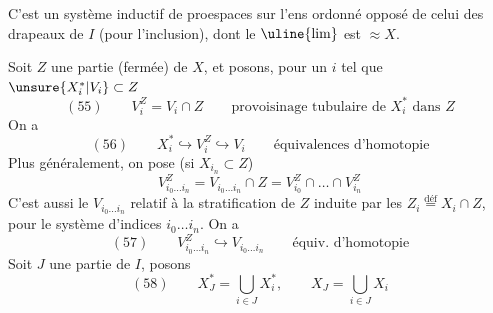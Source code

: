 C'est un système inductif de  proespaces
sur l'ens ordonné opposé de celui des drapeaux de $I$
(pour l'inclusion), dont le $\uline{\lim}$ est  $\approx X$.

Soit $Z$  une partie (fermée)
de $X$, et posons, pour \deleted{$\unsure{\forall}$} un $i$ tel que
$\unsure{X_i^*|V_i}\subset Z$
\[
(55)\qquad V_i^Z=V_i\cap Z\qquad
\text{provoisinage tubulaire de }X_i^*\text{ dans }Z
\]
On a
\[
(56)\qquad X_i^*\hookrightarrow V_i^Z\hookrightarrow V_i
\qquad\text{équivalences d'homotopie}
\]
Plus généralement, on pose (si $X_{i_n}\subset Z$)
\[
V_{i_0\ldots i_n}^Z=V_{i_0\ldots i_n}\cap Z
=V_{i_0}^Z\cap\ldots\cap V_{i_n}^Z
\]
C'est aussi le $V_{i_0\ldots i_n}$ relatif à la 
stratification de $Z$ induite par les
$Z_i\overset{\mathrm{déf}}{=}X_i\cap Z$, pour le système d'indices
$i_0\ldots i_n$. On a
\[
(57)\qquad V_{i_0\ldots i_n}^Z\hookrightarrow V_{i_0\ldots i_n}
\qquad\text{équiv. d'homotopie}
\]
Soit $J$ une partie de $I$, posons
\[
(58)\qquad X_J^*=\bigcup_{i\in J}X_i^*,\qquad X_J=\bigcup_{i\in J}X_i
\]
